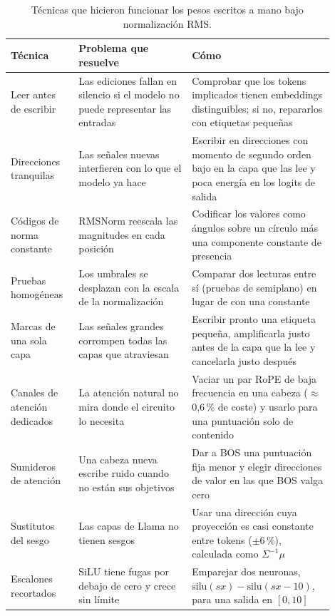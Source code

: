 \documentclass[11pt]{article}
\begin{document}
\begin{table}[h]
\centering
\small
\begin{tabular}{p{0.19\linewidth}p{0.32\linewidth}p{0.39\linewidth}}
\toprule
Técnica & Problema que resuelve & Cómo \\
\midrule
Leer antes de escribir & Las ediciones fallan en silencio si el modelo no puede representar las entradas & Comprobar que los tokens implicados tienen embeddings distinguibles; si no, repararlos con etiquetas pequeñas \\
Direcciones tranquilas & Las señales nuevas interfieren con lo que el modelo ya hace & Escribir en direcciones con momento de segundo orden bajo en la capa que las lee y poca energía en los logits de salida \\
Códigos de norma constante & RMSNorm reescala las magnitudes en cada posición & Codificar los valores como ángulos sobre un círculo más una componente constante de presencia \\
Pruebas homogéneas & Los umbrales se desplazan con la escala de la normalización & Comparar dos lecturas entre sí (pruebas de semiplano) en lugar de con una constante \\
Marcas de una sola capa & Las señales grandes corrompen todas las capas que atraviesan & Escribir pronto una etiqueta pequeña, amplificarla justo antes de la capa que la lee y cancelarla justo después \\
Canales de atención dedicados & La atención natural no mira donde el circuito lo necesita & Vaciar un par RoPE de baja frecuencia en una cabeza ($\approx$0,6\,\% de coste) y usarlo para una puntuación solo de contenido \\
Sumideros de atención & Una cabeza nueva escribe ruido cuando no están sus objetivos & Dar a BOS una puntuación fija menor y elegir direcciones de valor en las que BOS valga cero \\
Sustitutos del sesgo & Las capas de Llama no tienen sesgos & Usar una dirección cuya proyección es casi constante entre tokens ($\pm$6\,\%), calculada como $\Sigma^{-1}\mu$ \\
Escalones recortados & SiLU tiene fugas por debajo de cero y crece sin límite & Emparejar dos neuronas, $\mathrm{silu}(sx)-\mathrm{silu}(sx-10)$, para una salida en $[0,10]$ \\
\bottomrule
\end{tabular}
\caption{Técnicas que hicieron funcionar los pesos escritos a mano bajo normalización RMS.}
\label{tab:toolkit}
\end{table}
\end{document}
